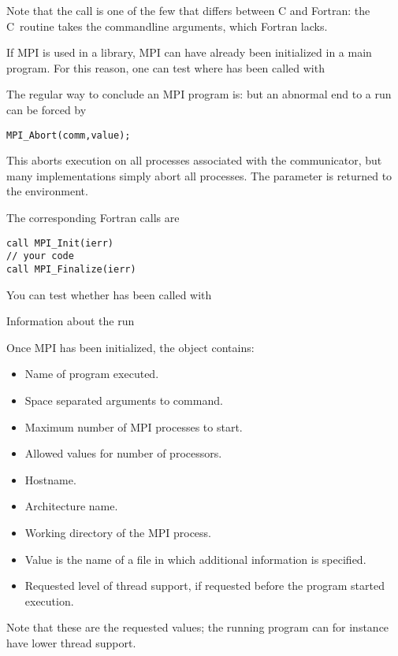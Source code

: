 Note that the  call is one of the few that differs between C and Fortran:
the C~routine takes the commandline arguments, which Fortran lacks.

If MPI is used in a library, MPI can have already been initialized in a main program.
For this reason, one can test where  has been called with
%
%

The regular way to conclude an MPI program is:
%
%
but an abnormal end to a run can be forced by
\begin{verbatim}
MPI_Abort(comm,value);
\end{verbatim}
This aborts execution on all processes associated with the communicator,
but many implementations simply abort all processes. The  parameter
is returned to the environment.

The corresponding Fortran calls are
\begin{verbatim}
call MPI_Init(ierr)
// your code
call MPI_Finalize(ierr)
\end{verbatim}

You can test whether  has been called with
%

 {Information about the run}

Once MPI has been initialized, the  object contains:
\begin{itemize}
\item {}
  Name of program executed.
\item  {}
  Space separated arguments to command.
\item  {}
  Maximum number of MPI processes to start.
\item   {}
  Allowed values for number of processors.
\item   {}
  Hostname.
\item   {}
  Architecture name.
\item   {}
  Working directory of the MPI process.
\item   {}
  Value is the name of a file in which additional information is specified.
\item   {}
  Requested level of thread support, if requested before the program started execution.
\end{itemize}
Note that these are the requested values; the running program can for instance
have lower thread support.

